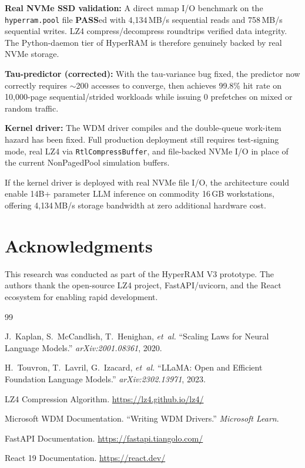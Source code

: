 \documentclass[11pt,a4paper]{article}
\newcommand{\code}[1]{\texttt{#1}}
\begin{document}
\textbf{Real NVMe SSD validation:} A direct mmap I/O benchmark on the \code{hyperram.pool} file \textbf{PASS}ed with 4{,}134\,MB/s sequential reads and 758\,MB/s sequential writes. LZ4 compress/decompress roundtrips verified data integrity. The Python-daemon tier of HyperRAM is therefore genuinely backed by real NVMe storage.

\textbf{Tau-predictor (corrected):} With the tau-variance bug fixed, the predictor now correctly requires $\sim$200 accesses to converge, then achieves 99.8\% hit rate on 10{,}000-page sequential/strided workloads while issuing 0 prefetches on mixed or random traffic.

\textbf{Kernel driver:} The WDM driver compiles and the double-queue work-item hazard has been fixed. Full production deployment still requires test-signing mode, real LZ4 via \code{RtlCompressBuffer}, and file-backed NVMe I/O in place of the current NonPagedPool simulation buffers.

If the kernel driver is deployed with real NVMe file I/O, the architecture could enable 14B+ parameter LLM inference on commodity 16\,GB workstations, offering 4{,}134\,MB/s storage bandwidth at zero additional hardware cost.

\section*{Acknowledgments}

This research was conducted as part of the HyperRAM V3 prototype. The authors thank the open-source LZ4 project, FastAPI/uvicorn, and the React ecosystem for enabling rapid development.

\begin{thebibliography}{99}

J.~Kaplan, S.~McCandlish, T.~Henighan, \textit{et~al.}
``Scaling Laws for Neural Language Models.''
\textit{arXiv:2001.08361}, 2020.

H.~Touvron, T.~Lavril, G.~Izacard, \textit{et~al.}
``LLaMA: Open and Efficient Foundation Language Models.''
\textit{arXiv:2302.13971}, 2023.

LZ4 Compression Algorithm.
\url{https://lz4.github.io/lz4/}

Microsoft WDM Documentation.
``Writing WDM Drivers.''
\textit{Microsoft Learn}.

FastAPI Documentation.
\url{https://fastapi.tiangolo.com/}

React 19 Documentation.
\url{https://react.dev/}

\end{thebibliography}
\end{document}
